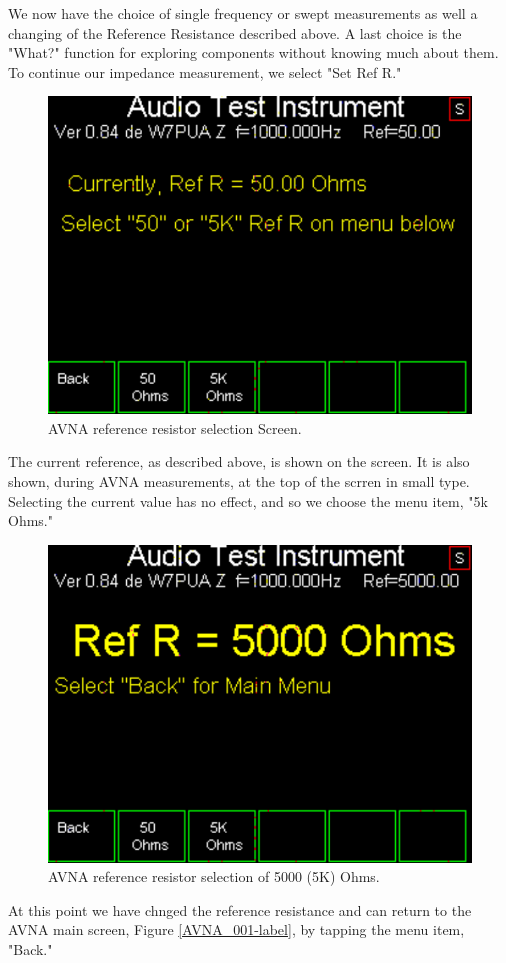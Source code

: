 %
 We now have the choice  of single frequency or swept measurements as well a changing of the Reference Resistance described above. 
A last choice is the "What?" function for exploring components without knowing much about them.
To continue our impedance measurement, we select "Set Ref R."
\begin{figure}[H]
\begin{center}
\includegraphics[scale=0.75]{./images/AVNA_003.pdf}
\caption{AVNA reference resistor selection  Screen.}
\label{AVNA_003-label}
\end{center}
\end{figure}
%
The current reference, as described above, is shown on the screen.
 It is also shown, during AVNA measurements, at the top of the scrren in small type.
Selecting the current value has no effect, and so we choose the menu item, "5k Ohms."
\begin{figure}[H]
\begin{center}
\includegraphics[scale=0.75]{./images/AVNA_004.pdf}
\caption{AVNA reference resistor selection of 5000 (5K) Ohms.}
\label{AVNA_004-label}
\end{center}
\end{figure}
At this point we have chnged the reference resistance and can return to the AVNA main screen, Figure \ref{AVNA_001-label}, by tapping the menu item, "Back."

